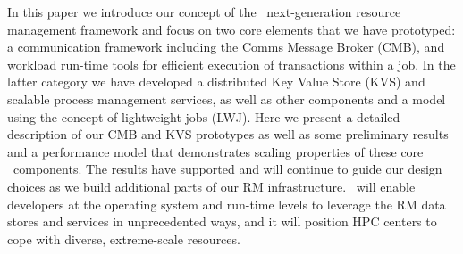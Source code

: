 In this paper we introduce our concept of the \flux\ next-generation
resource management framework
and focus on two core elements that we have prototyped: a
communication framework including the Comms Message Broker (CMB), and
workload
run-time tools for efficient execution of transactions within a job. In the
latter category we have developed a distributed Key Value Store (KVS) and
scalable process management services, as well as other components and a
model
using the concept of lightweight jobs (LWJ).
Here we present a detailed description of our CMB and KVS prototypes
as well as some preliminary results and a performance model that
demonstrates scaling properties of these core \flux\ components.
The results have supported and will continue to guide our design
choices as we build additional parts of our RM infrastructure.
\flux\ will enable developers at the operating system and
run-time levels to leverage the RM data stores and services in
unprecedented ways, and it will position HPC centers to cope
with diverse, extreme-scale resources.
